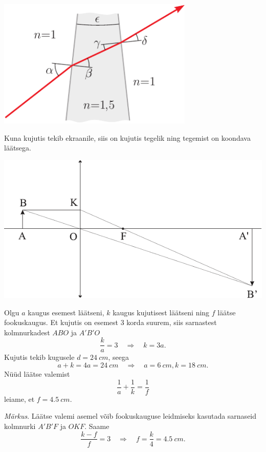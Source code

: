 \documentclass[10pt]{article}
\begin{document}
{\begin{center}
	\includegraphics[width=0.7\textwidth]{2007-v3g-03-yl}
\end{center}
\probend
\bigskip


\solu
Kuna kujutis tekib ekraanile, siis on kujutis tegelik ning tegemist on koondava läätsega.

\begin{center}
	\includegraphics[width=0.9\linewidth]{2009-lahg-02-lah}
\end{center}

Olgu $a$ kaugus esemest läätseni, $k$ kaugus kujutisest läätseni ning $f$ läätse fookuskaugus. Et kujutis on esemest \num{3} korda suurem, siis sarnastest kolmnurkadest $ABO$ ja $A'B'O$
\[
\frac{k}{a}=3 \quad \Rightarrow \quad k=3 a.
\]
Kujutis tekib kugusele $d = \SI{24}{cm}$, seega
\[
a+k=4 a=\SI{24}{cm} \quad \Rightarrow \quad a=\SI{6}{cm}, k=\SI{18}{cm}.
\]
Nüüd läätse valemist
\[
\frac{1}{a}+\frac{1}{k}=\frac{1}{f}
\]
leiame, et $f = \SI{4,5}{cm}$.

\emph{Märkus}. Läätse valemi asemel võib fookuskauguse leidmiseks kasutada sarnaseid kolmnurki $A'B'F$ ja $OKF$. Saame
\[
\frac{k-f}{f}=3 \quad \Rightarrow \quad f=\frac{k}{4}=\SI{4,5}{cm}.
\]
\probend
\bigskip

}
\end{document}
